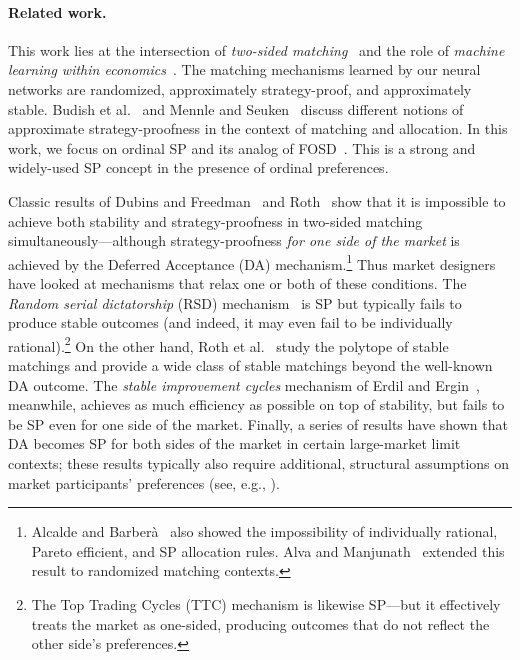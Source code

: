 \documentclass[11pt,letterpaper]{article}
\theoremstyle{definition}
\newcommand{\kibitz}[2]{\ifnum\Comments=1{\color{#1}{#2}}\fi}
\newcommand{\sdk}[1]{\kibitz{brass}{[SDK: #1]}}
\begin{document}
\paragraph{Related work.}
This work lies at the intersection of \emph{two-sided matching}~\cite{RothSotomayor1990} and the role of \emph{machine learning within economics}~\cite{Athey18}.
%
%
The matching mechanisms learned by our neural networks are randomized, approximately strategy-proof, and approximately stable. Budish et al.~\cite{BCKM13} and Mennle and Seuken~\cite{TimoSven16,mennle2021partial} discuss different notions of approximate strategy-proofness in the context of matching and allocation. In this work, we focus on ordinal SP and its analog of FOSD~\cite{Erdil14}. This is a strong and widely-used SP concept in the presence of ordinal preferences. 

Classic results of Dubins and Freedman~\cite{DubinsFreeman1981} and Roth~\cite{Roth82} show that it is impossible to achieve both stability and strategy-proofness in two-sided matching simultaneously---although strategy-proofness \textit{for one side of the market} is achieved by the Deferred Acceptance (DA) mechanism.\footnote{Alcalde and Barber\`{a}~\cite{alcalde1994top} also showed the impossibility of individually rational, Pareto efficient, and SP allocation rules. Alva and Manjunath~\cite{alva2020impossibility} extended this result to randomized matching contexts.} %
Thus market designers have looked at mechanisms that relax one or both of these conditions. The \emph{Random serial dictatorship} (RSD) mechanism~\cite{AS98} is SP but typically fails to produce stable outcomes (and indeed, it may even fail to be individually rational).\footnote{The Top Trading Cycles (TTC) mechanism is likewise SP---but it effectively treats the market as one-sided, producing outcomes that do not reflect the other side's preferences.} On the other hand, Roth et al.~\cite{Roth93} study the polytope of stable matchings and provide a wide class of stable matchings beyond the well-known DA outcome. The \textit{stable improvement cycles} mechanism of Erdil and Ergin~\cite{erdil2008s}, meanwhile, achieves as much efficiency as possible on top of stability, but fails to be SP even for one side of the market. Finally, a series of results have shown that DA becomes SP for both sides of the market in certain large-market limit contexts; these results typically  also require additional, structural assumptions on market participants' preferences (see, e.g., \cite{immorlica2015incentives,kojima2009incentives,lee2016incentive}).
\end{document}
